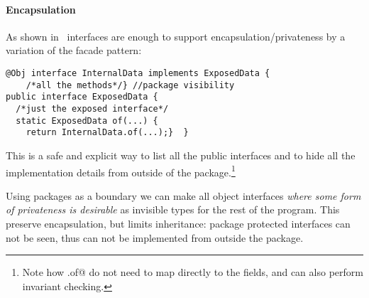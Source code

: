 \begin{comment}
@Obj interface Person$ extends Person{//will be further expanded by @Obj
  void name(String val);
  default void rename(String newName){ if(/*valid name*/){ this.name(val);}}
  String name();
  static Person from(String val){ if(/*valid name*/){return Person$.of(val);}
    throw /*invalid name*/}  }
\end{lstlisting}

This is not a perfect solution, since
\Q@Person$@ can still be seen inside the \Q@Person@ package and heirs of
\Q@Person$@,
however it is surprising we achieve such of a good result without any language
support for privacy in interfaces.
\end{comment}

\paragraph{Encapsulation} %

As shown in~\cite{BettiniDSS13} interfaces are enough to support encapsulation/privateness by a
 variation of the facade pattern:
\begin{lstlisting}
@Obj interface InternalData implements ExposedData {
    /*all the methods*/} //package visibility
public interface ExposedData {
  /*just the exposed interface*/
  static ExposedData of(...) {
    return InternalData.of(...);}  }
\end{lstlisting}

This is a safe and explicit way to list all the public interfaces and to hide all the implementation
details from outside of the package.\footnote{
Note how \Q@ExposedData.of@ do not need to map directly to the fields, and can also perform
invariant checking.}

Using packages as a boundary we can make all object interfaces \emph{where some form of privateness is desirable}
as invisible types for the rest of the program.
This preserve encapsulation, but limits inheritance:
package protected interfaces can not be seen,
thus can not be implemented from outside the package.

